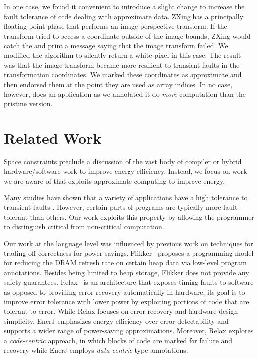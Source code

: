 In one case, we found it convenient to introduce a slight change to increase the
fault tolerance of code dealing with approximate data. ZXing has a principally
floating-point phase that performs an image perspective transform. If the
transform tried to access a coordinate outside of the image bounds,
ZXing would catch the  and print a
message saying that the image transform failed. We modified the algorithm to
silently return a white pixel in this case. The result was that the image
transform became more resilient to transient faults in the transformation
coordinates. We marked these coordinates as
approximate and then endorsed them at the point they are used as array
indices.
In no case, however, does an application as we annotated it do
\emph{more} computation than the pristine version.


\section{Related Work}
\label{enerj:sec:rel}

Space constraints preclude a discussion of the vast body of compiler
or hybrid hardware/software work to improve energy efficiency.
Instead, we focus on work we are aware of that exploits approximate
computing to improve energy.

Many studies have shown that a variety of applications have a high
tolerance to transient faults \cite{dekruijf-selse09, li07, ersa,
  softcomputing, wong-selse06, qosprof}. However, certain parts of
programs are typically more fault-tolerant than others. Our work
exploits this property by allowing the programmer to distinguish
critical from non-critical computation.

Our work at the language level was influenced by previous work on
techniques for trading off correctness for power
savings. Flikker~\cite{flikker} proposes a programming model for
reducing the DRAM refresh rate on certain heap data via low-level
program annotations. Besides being limited to heap storage, Flikker does not
provide any safety guarantees. Relax~\cite{relax} is an architecture
that exposes timing faults to software as opposed to providing error
recovery automatically in hardware; its goal is to improve error
tolerance with lower power by exploiting portions of code that are
tolerant to error. While Relax focuses on error
recovery and hardware design simplicity, EnerJ emphasizes
energy-efficiency over error detectability and supports a wider range
of power-saving approximations. Moreover, Relax explores a
\emph{code-centric} approach, in which blocks of code are marked for
failure and recovery while EnerJ employs \emph{data-centric} type
annotations.


